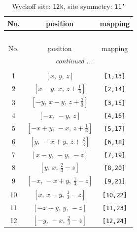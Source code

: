 \documentclass[fleqn,8pt]{jsarticle}
\begin{document}
\renewcommand{\arraystretch}{1.2}
\begin{longtable}{ccc}
\caption{Wyckoff site: {\tt 12k}, site symmetry: {\tt 11'}}
 \\
 \hline \hline
No. & position & mapping \\ \hline \endfirsthead

\multicolumn{2}{l}{\tablename\ \thetable{}} \\
 \hline \hline
No. & position & mapping \\ \hline \endhead

 \hline \hline
\multicolumn{2}{r}{\footnotesize\it continued ...} \\ \endfoot

 \hline \hline
\multicolumn{2}{r}{} \\ \endlastfoot

1 & $\left[ x,\, y,\, z \right]$ & {\tt [1,13]} \\ \hline
2 & $\left[ x - y,\, x,\, z + \frac{1}{3} \right]$ & {\tt [2,14]} \\ \hline
3 & $\left[ - y,\, x - y,\, z + \frac{2}{3} \right]$ & {\tt [3,15]} \\ \hline
4 & $\left[ - x,\, - y,\, z \right]$ & {\tt [4,16]} \\ \hline
5 & $\left[ - x + y,\, - x,\, z + \frac{1}{3} \right]$ & {\tt [5,17]} \\ \hline
6 & $\left[ y,\, - x + y,\, z + \frac{2}{3} \right]$ & {\tt [6,18]} \\ \hline
7 & $\left[ x - y,\, - y,\, - z \right]$ & {\tt [7,19]} \\ \hline
8 & $\left[ y,\, x,\, \frac{2}{3} - z \right]$ & {\tt [8,20]} \\ \hline
9 & $\left[ - x,\, - x + y,\, \frac{1}{3} - z \right]$ & {\tt [9,21]} \\ \hline
10 & $\left[ x,\, x - y,\, \frac{1}{3} - z \right]$ & {\tt [10,22]} \\ \hline
11 & $\left[ - x + y,\, y,\, - z \right]$ & {\tt [11,23]} \\ \hline
12 & $\left[ - y,\, - x,\, \frac{2}{3} - z \right]$ & {\tt [12,24]} \\
\end{longtable}
\end{document}
